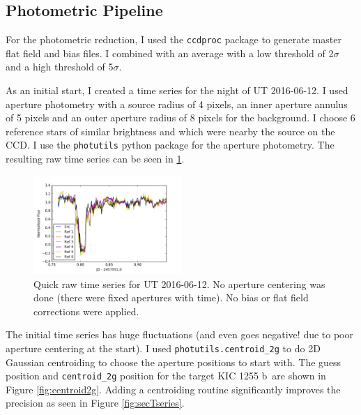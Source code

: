 \documentclass[twocolumn]{aastex61}
\newcommand{\sha}{KIC 1255 b}
\begin{document}
\subsection{Photometric Pipeline}

For the photometric reduction, I used the \texttt{ccdproc} package to generate master flat field and bias files.
I combined with an average with a low threshold of 2$\sigma$ and a high threshold of 5$\sigma$.

As an initial start, I created a time series for the night of UT 2016-06-12.
I used aperture photometry with a source radius of 4 pixels, an inner aperture annulus of 5 pixels and an outer aperture radius of 8 pixels for the background.
I choose 6 reference stars of similar brightness and which were nearby the source on the CCD.
I use the \texttt{photutils} python package for the aperture photometry.
The resulting raw time series can be seen in \ref{fig:initTseries}.

\begin{figure}
\begin{centering}
\includegraphics[width=0.5\textwidth]{initial_t_series.pdf}
\caption{Quick raw time series for UT 2016-06-12. No aperture centering was done (there were fixed apertures with time).
No bias or flat field corrections were applied.}\label{fig:initTseries}
\end{centering}
\end{figure}

The initial time series has huge fluctuations (and even goes negative! due to poor aperture centering at the start).
I used \texttt{photutils.centroid\_2g} to do 2D Gaussian centroiding to choose the aperture positions to start with.
The guess position and \texttt{centroid\_2g} position for the target \sha\ are shown in Figure \ref{fig:centroid2g}.
Adding a centroiding routine significantly improves the precision as seen in Figure \ref{fig:secTseries}.
\end{document}
